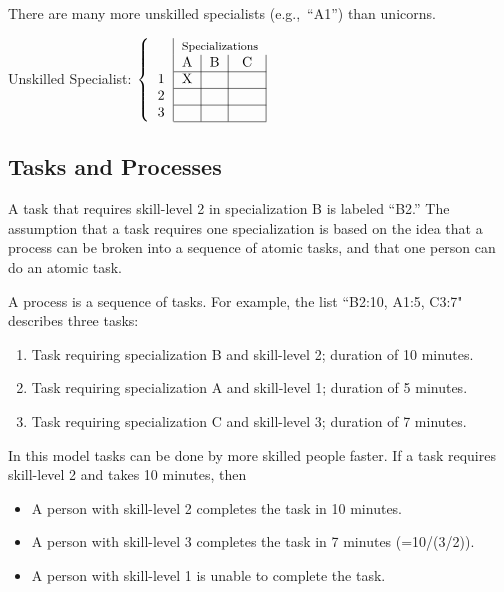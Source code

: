 There are many more unskilled specialists (e.g.,~``A1'') than unicorns.
\begin{center}
Unskilled Specialist:
$\left\{
\begin{tabular}{c|c|c|c|}
& \multicolumn{3}{c}{\footnotesize Specializations}\\
   & A & B & C \\
\cline{2-4}
 1 & X &   &  \\
\cline{2-4}
 2 &   &   & \\
\cline{2-4}
 3 &   &   & \\
\cline{2-4}
\end{tabular}
\right.$
\end{center}

\subsection*{Tasks and Processes}

A task that requires skill-level 2 in specialization B is labeled ``B2.''
The assumption that a task requires one specialization is based on the idea that a process can be broken into a sequence of atomic tasks, and that one person can do an atomic task. 

A process is a sequence of tasks. For example, the list ``B2:10, A1:5, C3:7" describes three tasks: 
\begin{enumerate}
    \item Task requiring specialization B and skill-level 2; duration of 10 minutes.
    \item Task requiring specialization A and skill-level 1; duration of 5 minutes.
    \item Task requiring specialization C and skill-level 3; duration of 7 minutes.    
\end{enumerate}

In this model tasks can be done by more skilled people faster. If a task requires skill-level 2 and takes 10 minutes, then
\begin{itemize}
    \item A person with skill-level 2 completes the task in 10 minutes.
    \item A person with skill-level 3 completes the task in  7 minutes (=10/(3/2)).
    \item A person with skill-level 1 is unable to complete the task.
\end{itemize}



